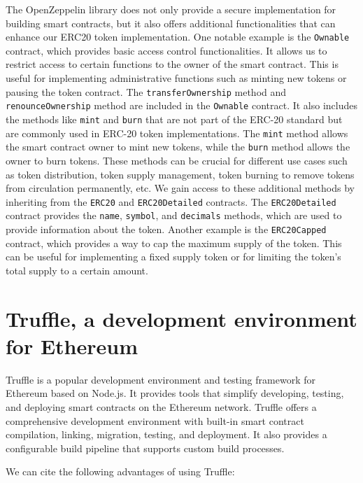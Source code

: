 The OpenZeppelin library does not only provide a secure implementation for building smart contracts,  but it also offers additional functionalities that can enhance our ERC20 token
implementation. One notable example is the \texttt{Ownable} contract, which provides basic access control functionalities. It allows us to restrict access to certain functions
to the owner of the smart contract. This is useful for implementing administrative functions such as minting new tokens or pausing the token contract. The \texttt{transferOwnership} method and \texttt{renounceOwnership}
method are included in the \texttt{Ownable} contract. It also includes the methods like \texttt{mint} and \texttt{burn} that are not part of the ERC-20 standard but are commonly used in ERC-20 token implementations. The \texttt{mint} method allows
the smart contract owner to mint new tokens, while the \texttt{burn} method allows the owner to burn tokens. These methods can be crucial for different use cases
such as token distribution, token supply management, token burning to remove tokens from circulation permanently, etc. We gain access to these additional methods
by inheriting from the \texttt{ERC20} and \texttt{ERC20Detailed} contracts. The \texttt{ERC20Detailed} contract provides the \texttt{name}, \texttt{symbol}, and \texttt{decimals} methods, which are used to
provide information about the token. Another example is the \texttt{ERC20Capped} contract, which provides a way to cap the maximum supply of the token. This can be useful for
implementing a fixed supply token or for limiting the token's total supply to a certain amount.


\section{Truffle, a development environment for Ethereum}
\label{sec:ch2_truffle}


Truffle \cite{truffle} is a popular development environment and testing framework for Ethereum based on Node.js. It provides tools that simplify
developing, testing, and deploying smart contracts on the Ethereum network. Truffle offers a comprehensive development environment with
built-in smart contract compilation, linking, migration, testing, and deployment. It also provides a configurable build pipeline that supports custom build processes.

We can cite the following advantages of using Truffle:


